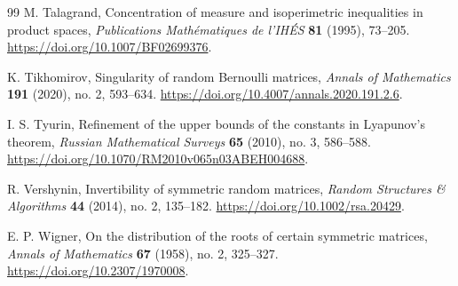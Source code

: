 \begin{thebibliography}{99}
M. Talagrand,
Concentration of measure and isoperimetric inequalities in product spaces,
\emph{Publications Math\'ematiques de l'IH\'ES} \textbf{81} (1995),
73--205.
\url{https://doi.org/10.1007/BF02699376}.

K. Tikhomirov,
Singularity of random Bernoulli matrices,
\emph{Annals of Mathematics} \textbf{191} (2020), no. 2, 593--634.
\url{https://doi.org/10.4007/annals.2020.191.2.6}.

I. S. Tyurin,
Refinement of the upper bounds of the constants in Lyapunov's theorem,
\emph{Russian Mathematical Surveys} \textbf{65} (2010), no. 3, 586--588.
\url{https://doi.org/10.1070/RM2010v065n03ABEH004688}.

R. Vershynin,
Invertibility of symmetric random matrices,
\emph{Random Structures \& Algorithms} \textbf{44} (2014), no. 2,
135--182.
\url{https://doi.org/10.1002/rsa.20429}.

E. P. Wigner,
On the distribution of the roots of certain symmetric matrices,
\emph{Annals of Mathematics} \textbf{67} (1958), no. 2, 325--327.
\url{https://doi.org/10.2307/1970008}.

\end{thebibliography}
